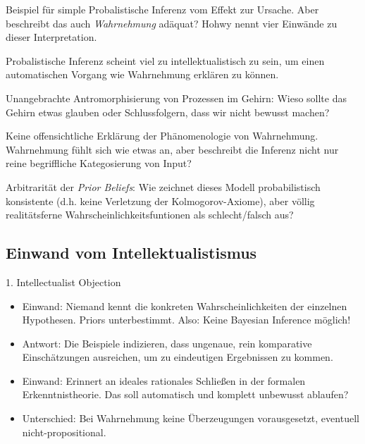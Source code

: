 \documentclass[11pt, handout]{beamer}
\begin{document}
\begin{frame}
  Beispiel für simple Probalistische Inferenz vom Effekt zur
  Ursache. Aber beschreibt das auch \emph{Wahrnehmung} adäquat? Hohwy
  nennt vier Einwände zu dieser Interpretation.  \footnotesize
  \begin{description}[<+->]
  \item[Einwand 1] Probalistische Inferenz scheint viel zu
    intellektualistisch zu sein, um einen automatischen Vorgang wie
    Wahrnehmung erklären zu können.
  \item[Einwand 2] Unangebrachte Antromorphisierung von Prozessen im
    Gehirn: Wieso sollte das Gehirn etwas glauben oder Schlussfolgern,
    dass wir nicht bewusst machen?
  \item[Einwand 3] Keine offensichtliche Erklärung der Phänomenologie
    von Wahrnehmung. Wahrnehmung fühlt sich wie etwas an, aber
    beschreibt die Inferenz nicht nur reine begriffliche Kategosierung
    von Input?
  \item[Einwand 4] Arbitrarität der \emph{Prior Beliefs}: Wie zeichnet
    dieses Modell probabilistisch konsistente (d.h. keine Verletzung
    der Kolmogorov-Axiome), aber völlig realitätsferne
    Wahrscheinlichkeitsfuntionen als schlecht/falsch aus?
  \end{description}
\end{frame}

\subsection{Einwand vom Intellektualistismus}

\begin{frame} {\large 1. Intellectualist Objection}
  \begin{itemize}
  \item Einwand: Niemand kennt die konkreten Wahrscheinlichkeiten der
    einzelnen Hypothesen. Priors unterbestimmt. Also: Keine Bayesian
    Inference möglich!
  \item Antwort: Die Beispiele indizieren, dass ungenaue, rein
    komparative Einschätzungen ausreichen, um zu eindeutigen
    Ergebnissen zu kommen.
  \item Einwand: Erinnert an ideales rationales Schließen in der
    formalen Erkenntnistheorie. Das soll automatisch und komplett
    unbewusst ablaufen?
  \item Unterschied: Bei Wahrnehmung keine Überzeugungen
    vorausgesetzt, eventuell nicht-propositional.


  \end{itemize}

\end{frame}
\end{document}
